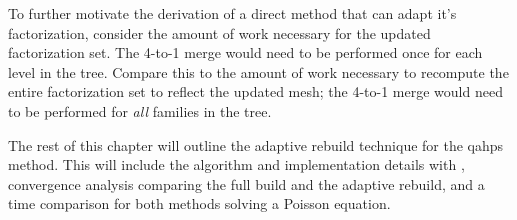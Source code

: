 To further motivate the derivation of a direct method that can adapt it's factorization, consider the amount of work necessary for the updated factorization set. The 4-to-1 merge would need to be performed once for each level in the tree. Compare this to the amount of work necessary to recompute the entire factorization set to reflect the updated mesh; the 4-to-1 merge would need to be performed for {\em all} families in the tree.

The rest of this chapter will outline the adaptive rebuild technique for the \gls{qahps} method. This will include the algorithm and implementation details with \pforest, convergence analysis comparing the full build and the adaptive rebuild, and a time comparison for both methods solving a Poisson equation.